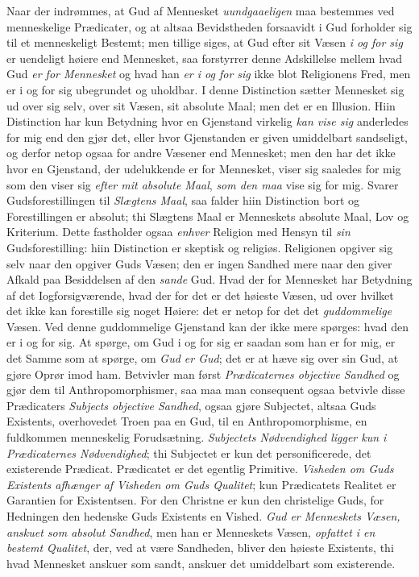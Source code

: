 Naar der indrømmes, at Gud af Mennesket \emph{uundgaaeligen} maa bestemmes ved
menneskelige Prædicater, og at altsaa Bevidstheden forsaavidt i Gud forholder
sig til et menneskeligt Bestemt; men tillige siges, at Gud efter sit Væsen
\emph{i og for sig} er uendeligt høiere end Mennesket, saa forstyrrer denne
Adskillelse mellem hvad Gud \emph{er for Mennesket} og hvad han \emph{er i og
for sig} ikke blot Religionens Fred, men er i og for sig ubegrundet og
uholdbar. I denne Distinction sætter Mennesket sig ud over sig selv, over sit
Væsen, sit absolute Maal; men det er en Illusion. Hiin Distinction har kun
Betydning hvor en Gjenstand virkelig \emph{kan vise sig} anderledes for mig end
den gjør det, eller hvor Gjenstanden er given umiddelbart sandseligt, og derfor
netop ogsaa for andre Væsener end Mennesket; men den har det ikke hvor en
Gjenstand, der udelukkende er for Mennesket, viser sig saaledes for mig som den
viser sig \emph{efter mit absolute Maal}, \emph{som den maa} vise sig for mig.
Svarer Gudsforestillingen til \emph{Slægtens Maal}, saa falder hiin Distinction
bort og Forestillingen er absolut; thi Slægtens Maal er Menneskets absolute
Maal, Lov og Kriterium. Dette fastholder ogsaa \emph{enhver} Religion med
Hensyn til \emph{sin} Gudsforestilling: hiin Distinction er skeptisk og
religiøs. Religionen opgiver sig selv naar den opgiver Guds Væsen; den er ingen
Sandhed mere naar den giver Afkald paa
 Besiddelsen af den \emph{sande} Gud. Hvad der for Mennesket har Betydning af
det Iogforsigværende, hvad der for det er det høieste Væsen, ud over hvilket
det ikke kan forestille sig noget Høiere: det er netop for det det
\emph{guddommelige} Væsen. Ved denne guddommelige Gjenstand kan der ikke mere
spørges: hvad den er i og for sig. At spørge, om Gud i og for sig er saadan som
han er for mig, er det Samme som at spørge, om \emph{Gud er Gud}; det er at
hæve sig over sin Gud, at gjøre Oprør imod ham. Betvivler man først
\emph{Prædicaternes objective Sandhed} og gjør dem til Anthropomorphismer, saa
maa man consequent ogsaa betvivle disse Prædicaters \emph{Subjects objective
Sandhed}, ogsaa gjøre Subjectet, altsaa Guds Existents, overhovedet Troen paa
en Gud, til en Anthropomorphisme, en fuldkommen menneskelig Forudsætning.
\emph{Subjectets Nødvendighed ligger kun i Prædicaternes Nødvendighed}; thi
Subjectet er kun det personificerede, det existerende Prædicat. Prædicatet er
det egentlig Primitive. \emph{Visheden om Guds Existents afhænger af Visheden
om Guds Qualitet}; kun Prædicatets Realitet er Garantien for Existentsen. For
den Christne er kun den christelige Guds, for Hedningen den hedenske Guds
Existents en Vished. \emph{Gud er Menneskets Væsen, anskuet som absolut
Sandhed}, men han er Menneskets Væsen, \emph{opfattet i en bestemt Qualitet},
der, ved at være Sandheden, bliver den høieste Existents, thi hvad Mennesket
anskuer som sandt, anskuer det umiddelbart som existerende.

